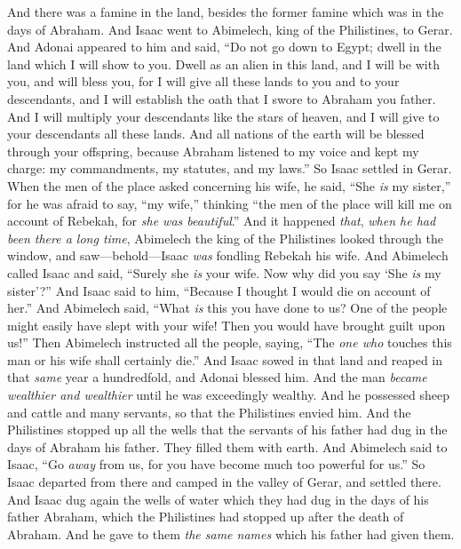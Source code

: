 \begin{biblechapter} %
 And there was a famine in the land, besides the former famine which was in the days of Abraham. And Isaac went to Abimelech, king of the Philistines, to Gerar.
\verse And Adonai appeared to him and said, “Do not go down to Egypt; dwell in the land which I will show to you.
\verse Dwell as an alien in this land, and I will be with you, and will bless you, for I will give all these lands to you and to your descendants, and I will establish the oath that I swore to Abraham you father.
\verse And I will multiply your descendants like the stars of heaven, and I will give to your descendants all these lands. And all nations of the earth will be blessed through your offspring,
\verse because Abraham listened to my voice and kept my charge: my commandments, my statutes, and my laws.”
\verse So Isaac settled in Gerar.
\verse When the men of the place asked concerning his wife, he said, “She \textit{is} my sister,” for he was afraid to say, “my wife,” thinking “the men of the place will kill me on account of Rebekah, for \textit{she was beautiful}.”
\verse And it happened \textit{that}, \textit{when he had been there a long time}, Abimelech the king of the Philistines looked through the window, and saw—behold—Isaac \textit{was} fondling Rebekah his wife.
\verse And Abimelech called Isaac and said, “Surely she \textit{is} your wife. Now why did you say ‘She \textit{is} my sister’?” And Isaac said to him, “Because I thought I would die on account of her.”
\verse And Abimelech said, “What \textit{is} this you have done to us? One of the people might easily have slept with your wife! Then you would have brought guilt upon us!”
\verse Then Abimelech instructed all the people, saying, “The \textit{one who} touches this man or his wife shall certainly die.”
\verse And Isaac sowed in that land and reaped in that \textit{same} year a hundredfold, and Adonai blessed him.
\verse And the man \textit{became wealthier and wealthier} until he was exceedingly wealthy.
\verse And he possessed sheep and cattle and many servants, so that the Philistines envied him.
\verse And the Philistines stopped up all the wells that the servants of his father had dug in the days of Abraham his father. They filled them with earth.
\verse And Abimelech said to Isaac, “Go \textit{away} from us, for you have become much too powerful for us.”
\verse So Isaac departed from there and camped in the valley of Gerar, and settled there.
\verse And Isaac dug again the wells of water which they had dug in the days of his father Abraham, which the Philistines had stopped up after the death of Abraham. And he gave to them \textit{the same names} which his father had given them.

\end{biblechapter}
